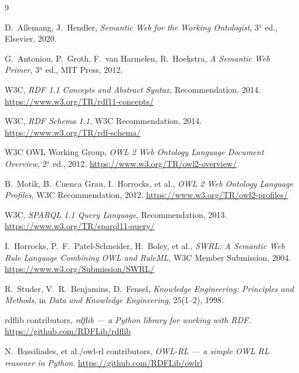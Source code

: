 \documentclass[a4paper,11pt]{article}
\begin{document}
\begin{thebibliography}{9}

D.~Allemang, J.~Hendler, \emph{Semantic Web for the Working Ontologist},
3$^{\mathrm{a}}$ ed., Elsevier, 2020.

G.~Antoniou, P.~Groth, F.~van Harmelen, R.~Hoekstra, \emph{A Semantic Web
Primer}, 3$^{\mathrm{a}}$ ed., MIT Press, 2012.

W3C, \emph{RDF 1.1 Concepts and Abstract Syntax}, Recommendation, 2014.
\url{https://www.w3.org/TR/rdf11-concepts/}

W3C, \emph{RDF Schema 1.1}, W3C Recommendation, 2014.
\url{https://www.w3.org/TR/rdf-schema/}

W3C OWL Working Group, \emph{OWL 2 Web Ontology Language Document
Overview}, 2$^{\mathrm{a}}$ ed., 2012.
\url{https://www.w3.org/TR/owl2-overview/}

B.~Motik, B.~Cuenca Grau, I.~Horrocks, et al., \emph{OWL 2 Web Ontology
Language Profiles}, W3C Recommendation, 2012.
\url{https://www.w3.org/TR/owl2-profiles/}

W3C, \emph{SPARQL 1.1 Query Language}, Recommendation, 2013.
\url{https://www.w3.org/TR/sparql11-query/}

I.~Horrocks, P.~F.~Patel-Schneider, H.~Boley, et al., \emph{SWRL: A
Semantic Web Rule Language Combining OWL and RuleML}, W3C Member
Submission, 2004. \url{https://www.w3.org/Submission/SWRL/}

R.~Studer, V.~R.~Benjamins, D.~Fensel, \emph{Knowledge Engineering:
Principles and Methods}, in \emph{Data and Knowledge Engineering},
25(1--2), 1998.

rdflib contributors, \emph{rdflib --- a Python library for working with
RDF}. \url{https://github.com/RDFLib/rdflib}

N.~Bassiliades, et al./owl-rl contributors, \emph{OWL-RL --- a simple OWL
RL reasoner in Python}. \url{https://github.com/RDFLib/owlrl}

\end{thebibliography}
\end{document}
